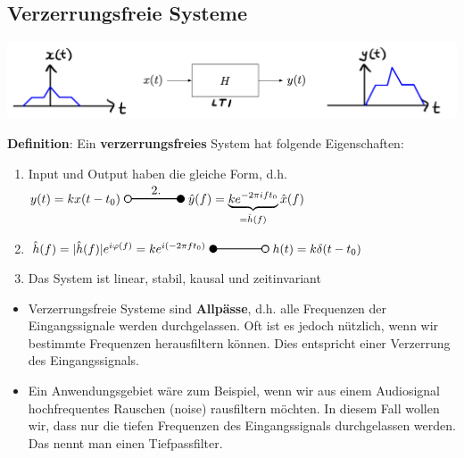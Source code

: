 \documentclass[11pt]{article}
\newcommand{\transform}[2]{%
    \begin{tikzpicture}
        \draw[thick] (0,0) circle (0.1);
        \draw[thick] (0.1,0) -- (#2,0) node[midway, above] {#1};
        \filldraw[thick] (#2,0) circle (0.1);
    \end{tikzpicture}%
}
\newcommand{\invtransform}[2]{%
    \begin{tikzpicture}
        \filldraw[thick] (0,0) circle (0.1);
        \draw[thick] (0.1,0) -- (#2 -0.1,0) node[midway, above] {#1};
        \draw[thick] (#2,0) circle (0.1);
    \end{tikzpicture}%
}
\begin{document}
\subsection*{Verzerrungsfreie Systeme}
\vspace*{-0.5cm}
\begin{center}
    \includegraphics[width=0.8\linewidth]{docimgs/Verzerrungsfrei.jpg}
\end{center}
\vspace*{-0.5cm}
\textbf{Definition}: Ein \textbf{verzerrungsfreies} System hat folgende Eigenschaften:
\vspace*{-0.5cm}
\begin{enumerate}
    \item Input und Output haben die gleiche Form, d.h.\\
    $y(t) = kx(t-t_0) \; \transform{2.}{1.5} \; \hat{y}(f) = \underbrace{ke^{-2\pi i f t_0}}_{= \hat{h}(f)}\hat{x}(f)$
    \item $\hat{h}(f) = |\hat{h}(f)|e^{i \varphi(f)} = k e^{i(-2 \pi f t_0)} \; \invtransform{}{1.5} \; h(t) = k \delta(t-t_0)$
    \item Das System ist linear, stabil, kausal und zeitinvariant
\end{enumerate}
\vspace*{-0.5cm}
\begin{itemize}
    \item Verzerrungsfreie Systeme sind \textbf{Allpässe}, d.h. alle Frequenzen der Eingangssignale werden durchgelassen. Oft ist es jedoch nützlich, wenn wir bestimmte Frequenzen herausfiltern können. Dies entspricht einer Verzerrung des Eingangssignals.
    \item Ein Anwendungsgebiet wäre zum Beispiel, wenn wir aus einem Audiosignal hochfrequentes Rauschen (noise) rausfiltern möchten. In diesem Fall wollen wir, dass nur die tiefen Frequenzen des Eingangssignals durchgelassen werden. Das nennt man einen Tiefpassfilter.
\end{itemize}

\vspace*{-0.75cm}
\end{document}

